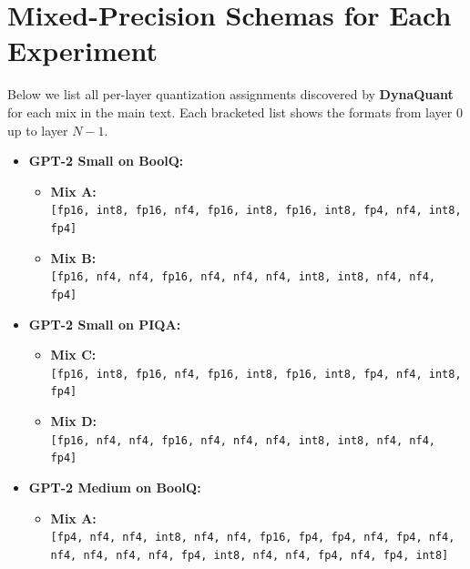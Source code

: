 \documentclass{article}
\begin{document}
	\balance
	
	
	
	\clearpage
	\appendix
	\section{Mixed-Precision Schemas for Each Experiment}
	\label{sec:appendix-schemas}
	
	{\small %
		
		Below we list all per-layer quantization assignments discovered by \textbf{DynaQuant} 
		for each mix in the main text. Each bracketed list shows
		the formats from layer 0 up to layer \(N-1\).
		
		\begin{itemize}
			\item \textbf{GPT-2 Small on BoolQ:}
			\begin{itemize}
				\item \textbf{Mix A:}\\
				\texttt{[fp16, int8, fp16, nf4, fp16, int8, fp16, int8, fp4, nf4, int8, fp4]}
				
				\item \textbf{Mix B:}\\
				\texttt{[fp16, nf4, nf4, fp16, nf4, nf4, nf4, int8, int8, nf4, nf4, fp4]}
			\end{itemize}
			\item \textbf{GPT-2 Small on PIQA:}
			\begin{itemize}
				\item \textbf{Mix C:}\\
				\texttt{[fp16, int8, fp16, nf4, fp16, int8, fp16, int8, fp4, nf4, int8, fp4]}
				
				\item \textbf{Mix D:}\\
				\texttt{[fp16, nf4, nf4, fp16, nf4, nf4, nf4, int8, int8, nf4, nf4, fp4]}
			\end{itemize}
			\item \textbf{GPT-2 Medium on BoolQ:}
			\begin{itemize}
				\item \textbf{Mix A:}\\
				\texttt{[fp4, nf4, nf4, int8, nf4, nf4, fp16, fp4, fp4, nf4, fp4, nf4, nf4, nf4, nf4, nf4, fp4, int8, nf4, nf4, fp4, nf4, fp4, int8]}
				

\end{itemize}
\end{itemize}}
\end{document}
